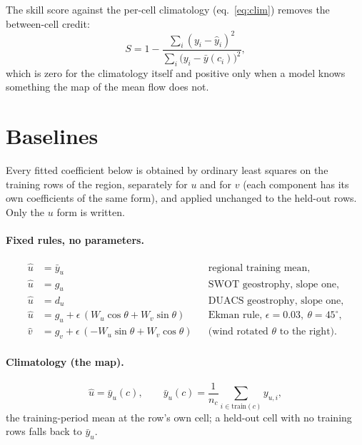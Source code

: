 \documentclass[11pt]{article}
\begin{document}
The skill score against the per-cell climatology (eq.~\ref{eq:clim}) removes
the between-cell credit:
\begin{equation}
S = 1 - \frac{\sum_i (y_i - \hat y_i)^2}{\sum_i \big(y_i - \bar y(c_i)\big)^2},
\label{eq:skill}
\end{equation}
which is zero for the climatology itself and positive only when a model
knows something the map of the mean flow does not.

\section{Baselines}

Every fitted coefficient below is obtained by ordinary least squares on the
training rows of the region, separately for $u$ and for $v$ (each component
has its own coefficients of the same form), and applied unchanged to the
held-out rows. Only the $u$ form is written.

\paragraph{Fixed rules, no parameters.}
\begin{align}
\hat u &= \bar y_u && \text{regional training mean,} \label{eq:trmean}\\
\hat u &= g_u && \text{SWOT geostrophy, slope one,} \label{eq:geos}\\
\hat u &= d_u && \text{DUACS geostrophy, slope one,} \label{eq:duacs}\\
\hat u &= g_u + \epsilon\,(W_u\cos\theta + W_v\sin\theta) && \text{Ekman rule, } \epsilon = 0.03,\ \theta = 45^\circ, \label{eq:ekman}\\
\hat v &= g_v + \epsilon\,(-W_u\sin\theta + W_v\cos\theta) && \text{(wind rotated } \theta \text{ to the right).} \nonumber
\end{align}

\paragraph{Climatology (the map).}
\begin{equation}
\hat u = \bar y_u(c), \qquad
\bar y_u(c) = \frac{1}{n_c}\sum_{i \in \text{train}(c)} y_{u,i},
\label{eq:clim}
\end{equation}
the training-period mean at the row's own cell; a held-out cell with no
training rows falls back to $\bar y_u$.
\end{document}
